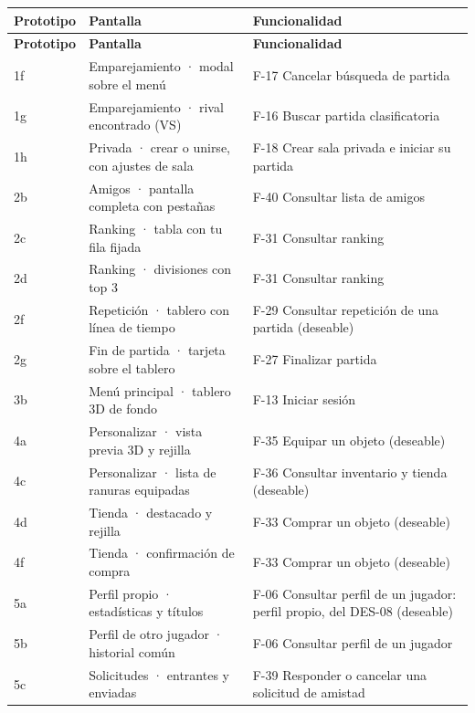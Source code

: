 \begin{center}\small
\begin{longtable}{|L{0.115\textwidth}|L{0.40\textwidth}|L{0.385\textwidth}|}
\hline
\textbf{Prototipo} & \textbf{Pantalla} & \textbf{Funcionalidad} \\ \hline
\endfirsthead
\hline
\textbf{Prototipo} & \textbf{Pantalla} & \textbf{Funcionalidad} \\ \hline
\endhead
1f & Emparejamiento · modal sobre el menú & \mbox{F-17} Cancelar búsqueda de partida \\ \hline
1g & Emparejamiento · rival encontrado (VS) & \mbox{F-16} Buscar partida clasificatoria \\ \hline
1h & Privada · crear o unirse, con ajustes de sala & \mbox{F-18} Crear sala privada e iniciar su partida \\ \hline
2b & Amigos · pantalla completa con pestañas & \mbox{F-40} Consultar lista de amigos \\ \hline
2c & Ranking · tabla con tu fila fijada & \mbox{F-31} Consultar ranking \\ \hline
2d & Ranking · divisiones con top 3 & \mbox{F-31} Consultar ranking \\ \hline
2f & Repetición · tablero con línea de tiempo & \mbox{F-29} Consultar repetición de una partida (deseable) \\ \hline
2g & Fin de partida · tarjeta sobre el tablero & \mbox{F-27} Finalizar partida \\ \hline
3b & Menú principal · tablero 3D de fondo & \mbox{F-13} Iniciar sesión \\ \hline
4a & Personalizar · vista previa 3D y rejilla & \mbox{F-35} Equipar un objeto (deseable) \\ \hline
4c & Personalizar · lista de ranuras equipadas & \mbox{F-36} Consultar inventario y tienda (deseable) \\ \hline
4d & Tienda · destacado y rejilla & \mbox{F-33} Comprar un objeto (deseable) \\ \hline
4f & Tienda · confirmación de compra & \mbox{F-33} Comprar un objeto (deseable) \\ \hline
5a & Perfil propio · estadísticas y títulos & \mbox{F-06} Consultar perfil de un jugador: perfil propio, del \mbox{DES-08} (deseable) \\ \hline
5b & Perfil de otro jugador · historial común & \mbox{F-06} Consultar perfil de un jugador \\ \hline
5c & Solicitudes · entrantes y enviadas & \mbox{F-39} Responder o cancelar una solicitud de amistad \\ \hline

\end{longtable}
\end{center}

